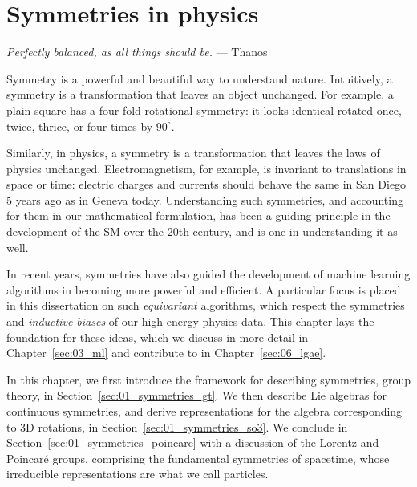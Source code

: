 
\chapter{Symmetries in physics}
\label{sec:01_symmetries}

\begin{center}
	\centering
	\noindent
	\textit{Perfectly balanced, as all things should be.} --- Thanos
\end{center}

Symmetry is a powerful and beautiful way to understand nature.
Intuitively, a symmetry is a transformation that leaves an object unchanged.
For example, a plain square has a four-fold rotational symmetry: it looks identical rotated once, twice, thrice, or four times by $90^{\circ}$.

Similarly, in physics, a symmetry is a transformation that leaves the laws of physics unchanged.
Electromagnetism, for example, is invariant to translations in space or time: electric charges and currents should behave the same in San Diego 5 years ago as in Geneva today.
Understanding such symmetries, and accounting for them in our mathematical formulation, has been a guiding principle in the development of the SM over the 20th century, and is one in understanding it as well.

In recent years, symmetries have also guided the development of machine learning algorithms in becoming more powerful and efficient.
A particular focus is placed in this dissertation on such \textit{equivariant} algorithms, which respect the symmetries and
\textit{inductive biases} of our high energy physics data.
This chapter lays the foundation for these ideas, which we discuss in more detail in Chapter~\ref{sec:03_ml} and contribute to in Chapter~\ref{sec:06_lgae}.

In this chapter, we first introduce the framework for describing symmetries, group theory, in Section~\ref{sec:01_symmetries_gt}.
We then describe Lie algebras for continuous symmetries, and derive representations for the algebra corresponding to 3D rotations, in Section~\ref{sec:01_symmetries_so3}.
We conclude in Section~\ref{sec:01_symmetries_poincare} with a discussion of the Lorentz and Poincaré groups, comprising the fundamental symmetries of spacetime, whose irreducible representations are what we call particles.

